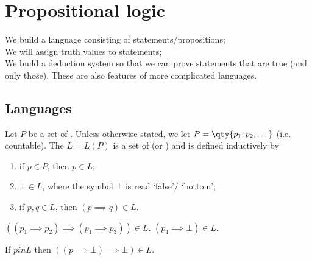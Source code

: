 \section{Propositional logic}

We build a language consisting of statements/propositions; \\
We will assign truth values to statements; \\
We build a deduction system so that we can prove statements that are true (and only those).
These are also features of more complicated languages.

\subsection{Languages}

Let $P$ be a set of .
Unless otherwise stated, we let $P = \qty{p_1, p_2, \dots}$ (i.e. countable).
The  $L = L(P)$ is a set of  (or ) and is defined inductively by
\begin{enumerate}
    \item if $p \in P$, then $p \in L$;
    \item $\bot \in L$, where the symbol $\bot$ is read `false'/ `bottom';
    \item if $p, q \in L$, then $(p \implies q) \in L$.
\end{enumerate}

\begin{example}
    $((p_1 \implies p_2) \implies (p_1 \implies p_3)) \in L$.
    $(p_4 \implies \bot) \in L$.

    If $p in L$ then $((p \implies \bot) \implies \bot) \in L$.
\end{example}

